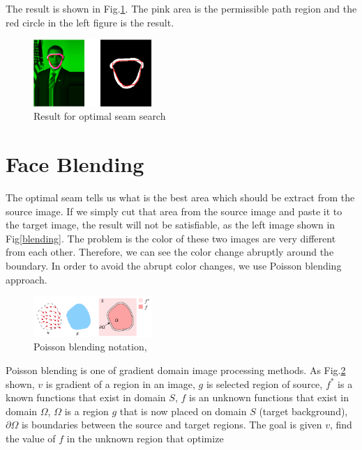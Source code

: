 \documentclass[10pt,twocolumn,letterpaper]{article}
\begin{document}
The result is shown in Fig.\ref{seam-result}. The pink area is the permissible path region and the red circle in the left figure is the result.

\begin{figure}[h]
  \centering
  \includegraphics[width=0.4\textwidth]{seam_result.eps}
  \caption{Result for optimal seam search}\label{seam-result}
\end{figure}

\section{Face Blending}
\label{sec:blending}
The optimal seam tells us what is the best area which should be extract from the source image. If we simply cut that area from the source image and paste it to the target image, the result will not be satisfiable, as the left image shown in Fig\ref{blending}. The problem is the color of these two images are very different from each other. Therefore, we can see the color change abruptly around the boundary. In order to avoid the abrupt color changes, we use Poisson blending approach.

\begin{figure}[h]
  \centering
  \includegraphics[width=0.4\textwidth]{poisson_blending_alg.png}
  \caption{Poisson blending notation, \cite{perez2003poisson} }\label{blending_alg}
\end{figure}

Poisson blending is one of gradient domain image processing methods. As Fig.\ref{blending_alg} shown, $v$ is gradient of a region in an image, $g$ is selected region of source, $f^*$ is a known functions that exist in domain $S$, $f$ is an unknown functions that exist in domain $\Omega$, $\Omega$ is a region $g$ that is now placed on domain $S$ (target background), $\partial{\Omega}$ is boundaries between the source and target regions. The goal is given $v$, find the value of $f$ in the unknown region that optimize
\end{document}
